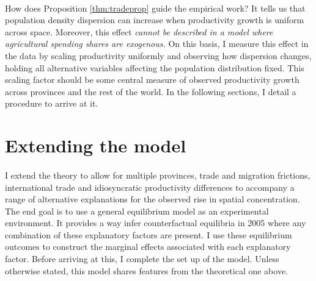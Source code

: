 \documentclass[]{article}
\theoremstyle{plain}
\begin{document}
\paragraph*{}

\paragraph*{}
How does Proposition \ref{thm:tradeprop} guide the empirical work? It tells us that population density dispersion can increase when productivity growth is uniform across space. Moreover, this effect \textit{cannot be described in a model where agricultural spending shares are exogenous.} On this basis, I measure this effect in the data by scaling productivity uniformly and observing how dispersion changes, holding all alternative variables affecting the population distribution fixed. This scaling factor should be some central measure of observed productivity growth across provinces and the rest of the world. In the following sections, I detail a procedure to arrive at it. 
\paragraph*{}

\section{Extending the model}\label{section:structmodel}

\paragraph*{}

I extend the theory to allow for multiple provinces, trade and migration frictions, international trade and idiosyncratic productivity differences to accompany a range of alternative explanations for the observed rise in spatial concentration. The end goal is to use a general equilibrium model as an experimental environment. It provides a way infer counterfactual equilibria in 2005 where any combination of these explanatory factors are present. I use these equilibrium outcomes to construct the marginal effects associated with each explanatory factor. Before arriving at this, I complete the set up of the model. Unless otherwise stated, this model shares features from the theoretical one above. 
\end{document}
